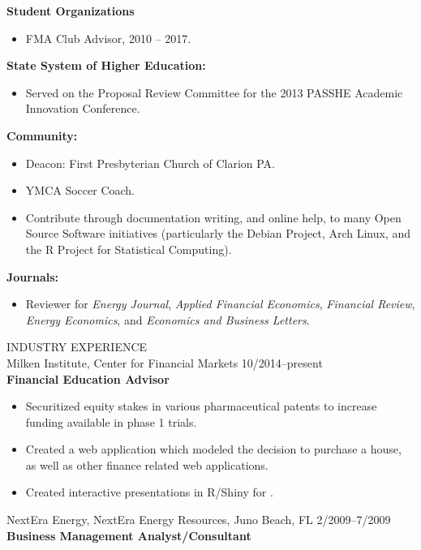 \documentclass[9pt]{article}
\begin{document}
{\bf Student Organizations}
\begin{itemize}[noitemsep, nolistsep]
\item FMA Club Advisor, 2010 -- 2017.
\end{itemize}
{\bf State System of Higher Education:}
\begin{itemize}[noitemsep, nolistsep]
\item Served on the Proposal Review Committee for the 2013 PASSHE Academic Innovation Conference.
\end{itemize}
{\bf Community:}
\begin{itemize}[noitemsep, nolistsep]
\item Deacon: First Presbyterian Church of Clarion PA.
\item YMCA Soccer Coach.
\item Contribute through documentation writing, and online help, to many Open Source Software initiatives (particularly the Debian Project, Arch Linux, and the R Project for Statistical Computing).
\end{itemize}
{\bf Journals:}
\begin{itemize}[noitemsep, nolistsep]
\item Reviewer for {\it Energy Journal}, {\it Applied Financial Economics}, {\it Financial Review}, {\it Energy Economics}, and {\it Economics and Business Letters}.
\end{itemize}
\vspace{10pt}
INDUSTRY EXPERIENCE \\
Milken Institute, Center for Financial Markets \hfill \hfill 10/2014--present\\
{\bf Financial Education Advisor} \\
\begin{itemize}[noitemsep, nolistsep]
  \item Securitized equity stakes in various pharmaceutical patents to increase funding available in phase 1 trials.
  \item Created a web application which modeled the decision to purchase a house, as well as other finance related web applications. 
  \item Created interactive presentations in R/Shiny for {\color{Blue}{5MinuteFinance.org}}.
\end{itemize}
\vspace{5pt}
NextEra Energy, NextEra Energy Resources, Juno Beach, FL \hfill  \hfill 2/2009--7/2009\\
{\bf Business Management Analyst/Consultant}
\end{document}
